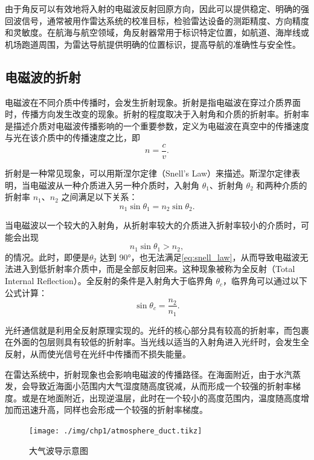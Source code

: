 由于角反可以有效地将入射的电磁波反射回原方向，因此可以提供稳定、明确的强回波信号，通常被用作雷达系统的校准目标，检验雷达设备的测距精度、方向精度和灵敏度。在航海与航空领域，角反射器常用于标识特定位置，如航道、海岸线或机场跑道周围，为雷达导航提供明确的位置标识，提高导航的准确性与安全性。


\subsection{电磁波的折射}

电磁波在不同介质中传播时，会发生折射现象。折射是指电磁波在穿过介质界面时，传播方向发生改变的现象。折射的程度取决于入射角和介质的折射率。折射率是描述介质对电磁波传播影响的一个重要参数，定义为电磁波在真空中的传播速度与光在该介质中的传播速度之比，即
\begin{equation}
    n = \frac{c}{v}.
    \label{eq:refraction_index}
\end{equation}

折射是一种常见现象，可以用斯涅尔定律（Snell's Law）来描述。斯涅尔定律表明，当电磁波从一种介质进入另一种介质时，入射角 $\theta_1$、折射角 $\theta_2$ 和两种介质的折射率 $n_1$、$n_2$ 之间满足以下关系：
\begin{equation}
    n_1 \sin \theta_1 = n_2 \sin \theta_2.
    \label{eq:snell_law}
\end{equation}

当电磁波以一个较大的入射角，从折射率较大的介质进入折射率较小的介质时，可能会出现
\[
    n_1 \sin \theta_1 > n_2,
\]
的情况。此时，即便是\( \theta_2 \) 达到 90°，也无法满足\cref{eq:snell_law}，从而导致电磁波无法进入到低折射率介质中，而是全部反射回来。这种现象被称为全反射（Total Internal Reflection）。全反射的条件是入射角大于临界角 $\theta_c$，临界角可以通过以下公式计算：
\begin{equation}
    \sin \theta_c = \frac{n_2}{n_1}.
    \label{eq:critical_angle}
\end{equation}

光纤通信就是利用全反射原理实现的。光纤的核心部分具有较高的折射率，而包裹在外面的包层则具有较低的折射率。当光线以适当的入射角进入光纤时，会发生全反射，从而使光信号在光纤中传播而不损失能量。

在雷达系统中，折射现象也会影响电磁波的传播路径。在海面附近，由于水汽蒸发，会导致近海面小范围内大气湿度随高度锐减，从而形成一个较强的折射率梯度。或是在地面附近，出现逆温层，此时在一个较小的高度范围内，温度随高度增加而迅速升高，同样也会形成一个较强的折射率梯度。

\begin{figure}[htb!]
    \centering
    \texttt{[image: ./img/chp1/atmosphere\_duct.tikz]}
    \caption{大气波导示意图}
    \label{fig_chp1_atmosphere_duct}
\end{figure}

